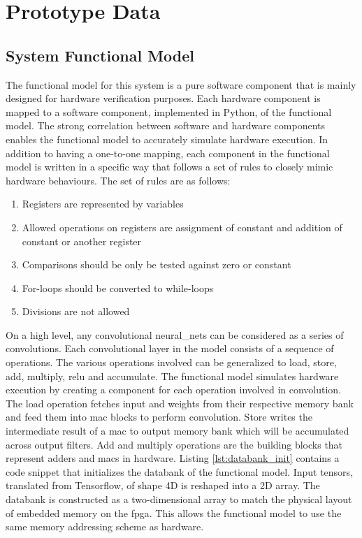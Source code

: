 \documentclass{uw-ece-wkrpt}
\begin{document}
\section{Prototype Data}

\subsection{System Functional Model}

The functional model for this system is a pure software component that is mainly designed for hardware verification purposes. Each hardware component is mapped to a software component, implemented in Python, of the functional model. The strong correlation between software and hardware components enables the functional model to accurately simulate hardware execution. In addition to having a one-to-one mapping, each component in the functional model is written in a specific way that follows a set of rules to closely mimic hardware behaviours. The set of rules are as follows:
\begin{enumerate}
    \item Registers are represented by variables
    \item Allowed operations on registers are assignment of constant and addition of constant or another register
    \item Comparisons should be only be tested against zero or constant
    \item For-loops should be converted to while-loops
    \item Divisions are not allowed
\end{enumerate}

On a high level, any convolutional \glspl{neural_net} can be considered as a series of convolutions.  Each convolutional layer in the model consists of a sequence of operations. The various operations involved can be generalized to load, store, add, multiply, \gls{relu} and accumulate. The functional model simulates hardware execution by creating a component for each operation involved in convolution. The load operation fetches input and weights from their respective memory bank and feed them into \gls{mac} blocks to perform convolution. Store writes the intermediate result of a \gls{mac} to output memory bank which will be accumulated across output \glspl{filter}. Add and multiply operations are the building blocks that represent adders and \glspl{mac} in hardware. Listing \ref{lst:databank_init} contains a code snippet that initializes the databank of the functional model. Input \glspl{tensor}, translated from Tensorflow, of shape 4D is reshaped into a 2D array. The databank is constructed as a two-dimensional array to match the physical layout of embedded memory on the \gls{fpga}. This allows the functional model to use the same memory addressing scheme as hardware.
\end{document}
